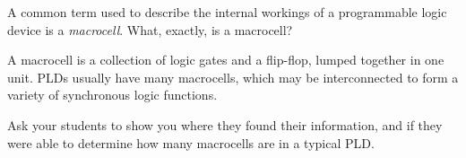 

A common term used to describe the internal workings of a programmable logic device is a {\it macrocell}.  What, exactly, is a macrocell?







A macrocell is a collection of logic gates and a flip-flop, lumped together in one unit.  PLDs usually have many macrocells, which may be interconnected to form a variety of synchronous logic functions.







Ask your students to show you where they found their information, and if they were able to determine how many macrocells are in a typical PLD.




